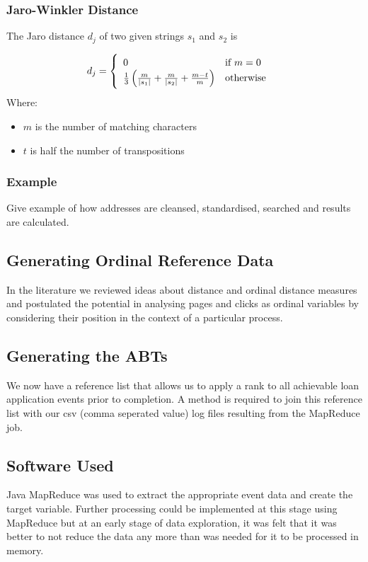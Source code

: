 \subsubsection{Jaro-Winkler Distance}
The Jaro distance $d_j$ of two given strings $s_1$ and $s_2$ is

\begin{align}
d_j =\begin{cases}
\begin{array}{l l}
	0 & \text{if }m = 0\\
	\frac{1}{3}\left(\frac{m}{|s_1|} + \frac{m}{|s_2|} + \frac{m-t}{m}\right) & \text{otherwise} \end{array} \end{cases}
\end{align}
Where: 
\vspace{-7mm} 
\begin{itemize}
	\item $m$ is the number of matching characters 
	\item $t$ is half the number of transpositions
\end{itemize}

\subsubsection{Example}
Give example of how addresses are cleansed, standardised, searched and results are calculated.


\subsection{Generating Ordinal Reference Data}\label{ordRef}
In the literature we reviewed ideas about distance and ordinal distance measures and postulated the potential in analysing pages and clicks as ordinal variables by considering their position in the context of a particular process. 


\subsection{Generating the ABTs}
We now have a reference list that allows us to apply a rank to all achievable loan application events prior to completion. A method is required to join this reference list with our csv (comma seperated value) log files resulting from the MapReduce job. 


\subsection{Software Used}\label{soft}
Java MapReduce was used to extract the appropriate event data and create the target variable. Further processing could be implemented at this stage using MapReduce but at an early stage of data exploration, it was felt that it was better to not reduce the data any more than was needed for it to be processed in memory.


